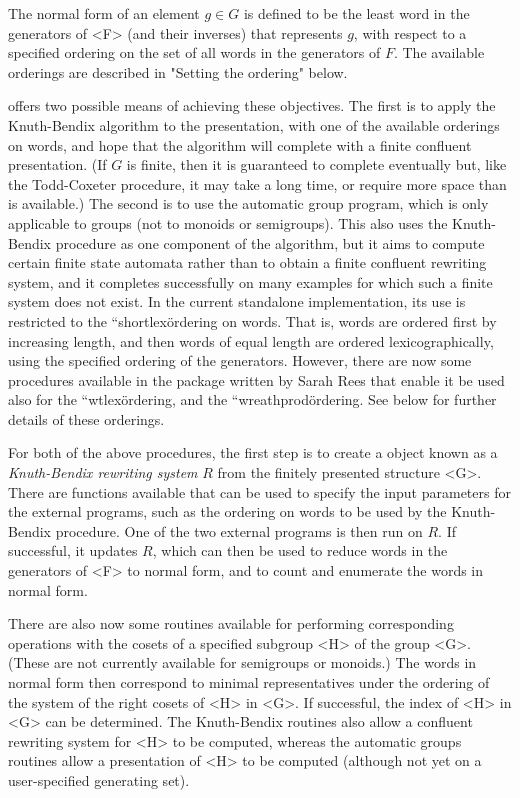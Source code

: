 The  normal form of an element  $g \in G$ is defined  to be the least
word in the generators of <F> (and their inverses) that represents $g$,
with respect to  a specified ordering on the  set of all  words in the
generators of $F$.  The available  orderings are described  in "Setting
the ordering" below.

{\KBMAG} offers two possible means of achieving these objectives.  The
first   is   to apply   the   Knuth-Bendix   algorithm  to  the
presentation, with one of the  available orderings on words, and  hope
that the algorithm will complete with a finite confluent presentation.
(If $G$ is finite, then it is  guaranteed to complete eventually
but,  like the  Todd-Coxeter procedure, it  may  take a long  time, or
require more space  than  is  available.)  The second  is  to  use the
automatic group program, which is only applicable to groups (not to
monoids or semigroups). This  also uses the Knuth-Bendix procedure as
one component of the algorithm, but  it aims to compute certain finite
state  automata rather  than to obtain   a  finite confluent rewriting
system, and it completes successfully on many  examples for which such
a finite system does not exist. In the current standalone implementation,
its use is  restricted to the ``shortlex\" ordering  on words.  That is,
words are
ordered first by increasing length, and then words of equal length are
ordered lexicographically,   using the    specified ordering  of   the
generators. However, there are now some {\GAP} procedures available
in the package written by Sarah Rees that enable it be used also for the
``wtlex\" ordering, and the ``wreathprod\" ordering. See below for further
details of these orderings.

For both of the above procedures, the first step is to create a {\GAP}
object   known as  a  {\it Knuth-Bendix rewriting  system}  $R$ from the
finitely
presented structure <G>.  There are functions available that can be used to
specify  the input parameters  for the external  programs, such as the
ordering on words to be used by the Knuth-Bendix procedure. One of the
two  external programs is then run  on  $R$. If successful, it updates
$R$, which  can then be  used to reduce words in
the generators of <F> to normal form, and  to count and  enumerate the
words in normal form.

There are also now some routines available for performing
corresponding operations with the cosets of a specified subgroup
<H> of the group <G>. (These are not currently available for semigroups or
monoids.) The words in normal form then correspond to minimal
representatives under the ordering of the system of the right
cosets of <H> in <G>. If successful, the index of <H> in <G> can
be determined. The Knuth-Bendix routines also allow a confluent
rewriting system for <H> to be computed, whereas the automatic groups
routines allow a presentation of <H> to be computed (although not yet on
a user-specified generating set).

